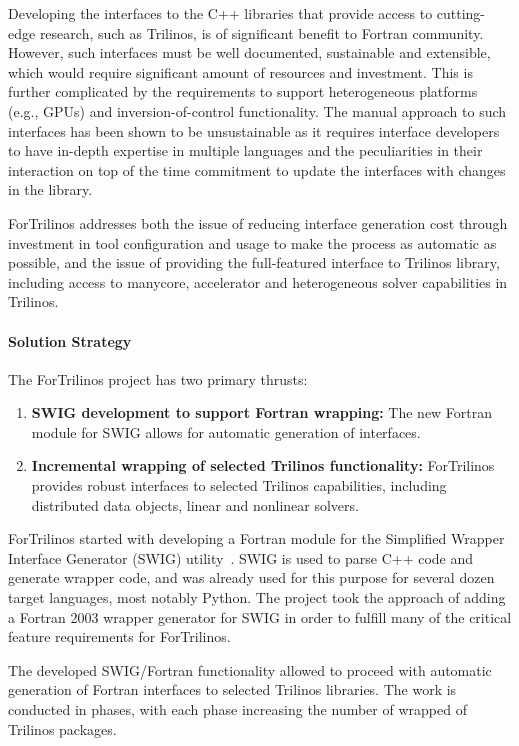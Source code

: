 Developing the interfaces to the C++ libraries that provide access to cutting-edge research, such as Trilinos,  is of significant benefit to Fortran community. However, such interfaces must be well documented, sustainable and extensible, which would require significant amount of resources and investment. This is further complicated by the requirements to support heterogeneous platforms (e.g., GPUs) and inversion-of-control functionality. The manual approach to such interfaces has been shown to be unsustainable as it requires interface developers to have in-depth expertise in  multiple languages and the peculiarities in their interaction on top of the time commitment to update the interfaces with changes in the library.

ForTrilinos addresses both the issue of reducing interface generation cost through investment in tool configuration and usage to make the process as automatic as possible, and the issue of providing the full-featured interface to Trilinos library, including access to manycore, accelerator and heterogeneous solver capabilities in Trilinos.

\paragraph{Solution Strategy}

The ForTrilinos project has two primary thrusts:
\begin{enumerate}
  \item \textbf{SWIG development to support Fortran wrapping:} The new Fortran
    module for SWIG allows for automatic generation of interfaces.
  \item \textbf{Incremental wrapping of selected Trilinos functionality:}
    ForTrilinos provides robust interfaces to selected Trilinos capabilities,
    including distributed data objects, linear and nonlinear solvers.
\end{enumerate}

ForTrilinos started with developing a Fortran module for the Simplified Wrapper Interface Generator (SWIG) utility~\cite{beazley1996swig}. SWIG is used to parse C++ code and generate wrapper code, and was already used for this purpose for several dozen target languages, most notably Python. The project took the approach of adding a Fortran 2003 wrapper generator for SWIG in order to fulfill many of the critical feature requirements for ForTrilinos.

The developed SWIG/Fortran functionality allowed to proceed with automatic generation of Fortran interfaces to selected Trilinos libraries. The work is conducted in phases, with each phase increasing the number of wrapped of Trilinos packages.

